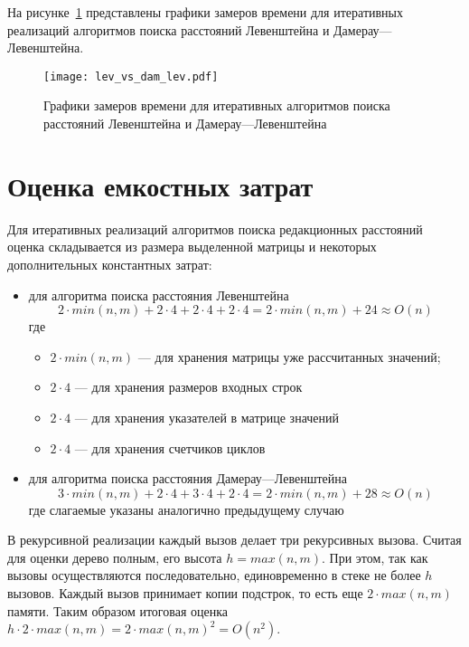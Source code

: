 На рисунке~\ref{fig:lev_dam_lev_plots} представлены графики замеров времени для итеративных реализаций алгоритмов поиска расстояний Левенштейна и Дамерау---Левенштейна.
\begin{figure}[H]
	\centering
	\texttt{[image: lev\_vs\_dam\_lev.pdf]}
	\caption{Графики замеров времени для итеративных алгоритмов поиска расстояний Левенштейна и Дамерау---Левенштейна}
	\label{fig:lev_dam_lev_plots}
\end{figure} 

\section{Оценка емкостных затрат}

Для итеративных реализаций алгоритмов поиска редакционных расстояний оценка складывается из размера выделенной матрицы и некоторых дополнительных константных затрат:
\begin{itemize}[label=---]
	\item для алгоритма поиска расстояния Левенштейна 
	\begin{equation}
		2\cdot min(n, m) + 2\cdot 4 + 2 \cdot 4 + 2 \cdot 4 = 2 \cdot min(n, m) + 24 \approx O(n)
	\end{equation}
	где\begin{itemize}
		\item $2\cdot min(n, m)$ --- для хранения матрицы уже рассчитанных значений;
		\item $2\cdot 4$ --- для хранения размеров входных строк
		\item $2\cdot 4$ --- для хранения указателей в матрице значений
		\item $2\cdot 4$ --- для хранения счетчиков циклов
	\end{itemize}
	\item для алгоритма поиска расстояния Дамерау---Левенштейна
	\begin{equation}
		3\cdot min(n, m) + 2\cdot 4 + 3 \cdot 4 + 2 \cdot 4 = 2 \cdot min(n, m) + 28 \approx O(n)
	\end{equation}
	где слагаемые указаны аналогично предыдущему случаю
\end{itemize}

В рекурсивной реализации каждый вызов делает три рекурсивных вызова. Считая для оценки дерево полным, его высота $h = max(n, m)$. При этом, так как вызовы осуществляются последовательно, единовременно в стеке не более $h$ вызовов. Каждый вызов принимает копии подстрок, то есть еще $2 \cdot max(n, m)$ памяти. Таким образом итоговая оценка $h \cdot 2 \cdot max(n, m) = 2 \cdot max(n, m)^2 = O(n^2)$.
